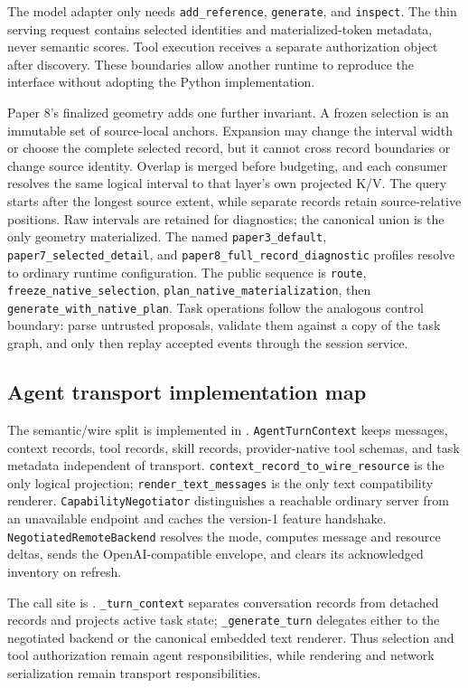 \documentclass[11pt]{article}
\begin{document}
The model adapter only needs \texttt{add\_reference}, \texttt{generate}, and
\texttt{inspect}.  The thin serving request contains selected identities and
materialized-token metadata, never semantic scores.  Tool execution receives a
separate authorization object after discovery.  These boundaries allow another
runtime to reproduce the interface without adopting the Python implementation.

Paper 8's finalized geometry adds one further invariant. A frozen selection is
an immutable set of source-local anchors. Expansion may change the interval
width or choose the complete selected record, but it cannot cross record
boundaries or change source identity. Overlap is merged before budgeting, and
each consumer resolves the same logical interval to that layer's own projected
K/V. The query starts after the longest source extent, while separate records
retain source-relative positions. Raw intervals are retained for diagnostics;
the canonical union is the only geometry materialized. The named
\texttt{paper3\_default}, \texttt{paper7\_selected\_detail}, and
\texttt{paper8\_full\_record\_diagnostic} profiles resolve to ordinary runtime
configuration. The public sequence is \texttt{route}, \texttt{freeze\_native\_selection},
\texttt{plan\_native\_materialization}, then
\texttt{generate\_with\_native\_plan}. Task operations follow the analogous
control boundary: parse untrusted proposals, validate them against a copy of
the task graph, and only then replay accepted events through the session service.

\subsection{Agent transport implementation map}

The semantic/wire split is implemented in
. \texttt{AgentTurnContext} keeps messages,
context records, tool records, skill records, provider-native tool schemas, and
task metadata independent of transport. \texttt{context\_record\_to\_wire\_resource}
is the only logical projection; \texttt{render\_text\_messages} is the only text
compatibility renderer. \texttt{CapabilityNegotiator} distinguishes a reachable
ordinary server from an unavailable endpoint and caches the version-1 feature
handshake. \texttt{NegotiatedRemoteBackend} resolves the mode, computes message
and resource deltas, sends the OpenAI-compatible envelope, and clears its
acknowledged inventory on refresh.

The call site is . \texttt{\_turn\_context} separates
conversation records from detached records and projects active task state;
\texttt{\_generate\_turn} delegates either to the negotiated backend or the
canonical embedded text renderer. Thus selection and tool authorization remain
agent responsibilities, while rendering and network serialization remain
transport responsibilities.
\end{document}
